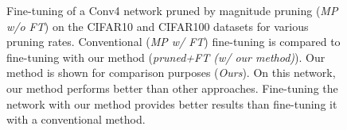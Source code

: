 
\begin{figure}
\centering
{}
  \caption{ Fine-tuning of a Conv4 network pruned by magnitude pruning
  (\emph{MP w/o FT}) on the CIFAR10 and CIFAR100 datasets for various pruning
  rates. Conventional (\emph{MP w/ FT}) fine-tuning is compared to fine-tuning
  with our method (\emph{pruned+FT (w/ our method)}). Our method is shown for
  comparison purposes (\emph{Ours}). On this network, our method performs better
  than other approaches. Fine-tuning the network with our method provides better
  results than fine-tuning it with a conventional method.}
    \label{fig:chap1:finetuning_impact_conv4}
\end{figure}


